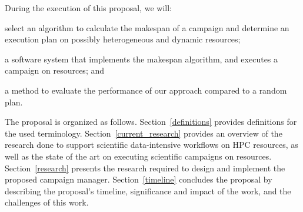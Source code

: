 During the execution of this proposal, we will:
\begin{inparaenum}[(1)]
\item select an algorithm to calculate the makespan of a campaign and determine an execution plan on possibly heterogeneous and dynamic resources;
\item a software system that implements the makespan algorithm, and executes a campaign on resources; and 
\item a method to evaluate the performance of our approach compared to a random plan. 
\end{inparaenum}

The proposal is organized as follows.
Section~\ref{definitions} provides definitions for the used terminology.
Section~\ref{current_research} provides an overview of the research done to support scientific data-intensive workflows on HPC resources, as well as the state of the art on executing scientific campaigns on resources.
Section~\ref{research} presents the research required to design and implement the proposed campaign manager.
Section~\ref{timeline} concludes the proposal by describing the proposal's timeline, significance and impact of the work, and the challenges of this work.